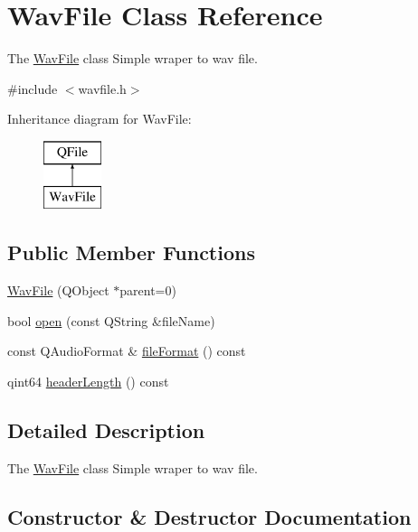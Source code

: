 \hypertarget{class_wav_file}{}\section{Wav\+File Class Reference}
\label{class_wav_file}


The \hyperlink{class_wav_file}{Wav\+File} class Simple wraper to wav file.  




{\ttfamily \#include $<$wavfile.\+h$>$}

Inheritance diagram for Wav\+File\+:\begin{figure}[H]
\begin{center}
\leavevmode
\includegraphics[height=2.000000cm]{class_wav_file}
\end{center}
\end{figure}
\subsection*{Public Member Functions}
\begin{DoxyCompactItemize}
\item 
\hyperlink{class_wav_file_afaaa4dfab63fc0f4554ee36184c7b3d4}{Wav\+File} (Q\+Object $\ast$parent=0)
\item 
bool \hyperlink{class_wav_file_a60680d00e08ed8ebbe33d624b6d0cd16}{open} (const Q\+String \&file\+Name)
\item 
const Q\+Audio\+Format \& \hyperlink{class_wav_file_a9b2f3e3e7602540cda66562db243e332}{file\+Format} () const
\item 
qint64 \hyperlink{class_wav_file_a800a698411cfd6f5fdecc42beb053fb9}{header\+Length} () const
\end{DoxyCompactItemize}


\subsection{Detailed Description}
The \hyperlink{class_wav_file}{Wav\+File} class Simple wraper to wav file. 

\subsection{Constructor \& Destructor Documentation}
\hypertarget{class_wav_file_afaaa4dfab63fc0f4554ee36184c7b3d4}{}\label{class_wav_file_afaaa4dfab63fc0f4554ee36184c7b3d4} 
